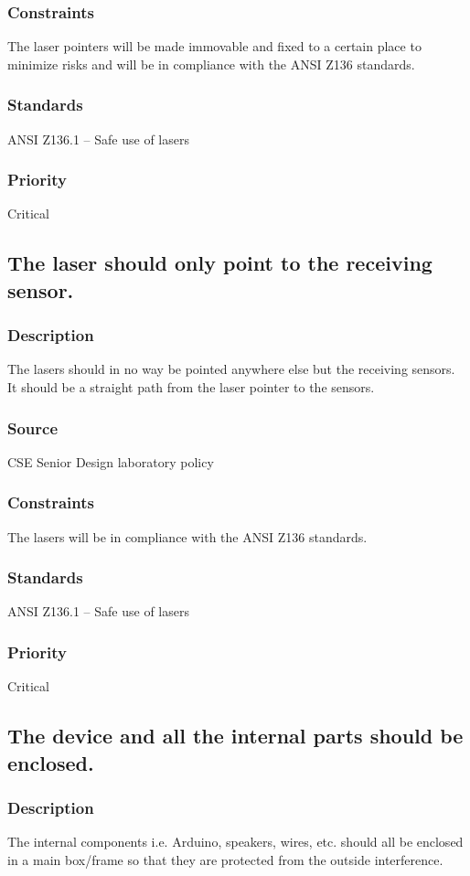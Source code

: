 \subsubsection{Constraints}
The laser pointers will be made immovable and fixed to a certain place to minimize risks and will be in compliance with the ANSI Z136 standards.
\subsubsection{Standards}
ANSI Z136.1 – Safe use of lasers
\subsubsection{Priority}
Critical

\subsection{The laser should only point to the receiving sensor.}
\subsubsection{Description}
The lasers should in no way be pointed anywhere else but the receiving sensors. It should be a straight path from the laser pointer to the sensors.
\subsubsection{Source}
CSE Senior Design laboratory policy
\subsubsection{Constraints}
The lasers will be in compliance with the ANSI Z136 standards.
\subsubsection{Standards}
ANSI Z136.1 – Safe use of lasers
\subsubsection{Priority}
Critical

\subsection{The device and all the internal parts should be enclosed.}
\subsubsection{Description}
The internal components i.e. Arduino, speakers, wires, etc. should all be enclosed in a main box/frame so that they are protected from the outside interference.
